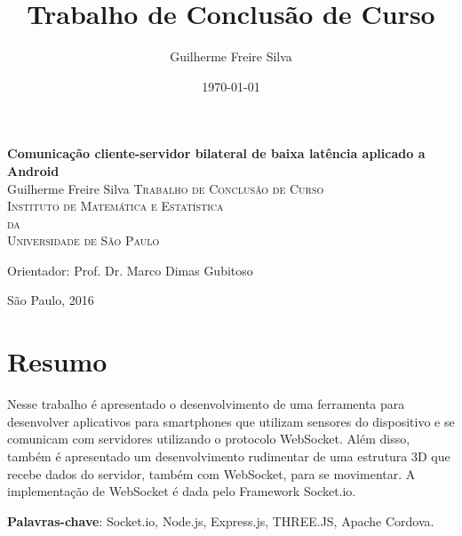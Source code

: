 \documentclass[a4paper,12pt]{article}
\title{Trabalho de Conclusão de Curso}
\author{Guilherme Freire Silva}
\date{\today}
\begin{document}

\thispagestyle{empty}
\begin{center}
    \vspace*{2.3cm}
    \textbf{\Large{Comunicação cliente-servidor bilateral de baixa latência aplicado a Android}}\\


    \vspace*{1.2cm}
    \Large{
        Guilherme Freire Silva
    }
    \vskip 2cm
    \textsc{
     Trabalho de Conclusão de Curso \\[-0.25cm]
    Instituto de Matemática e Estatística\\[-0.25cm]
    da\\[-0.25cm]
    Universidade de São Paulo\\[-0.25cm]%
    }

    \vskip 2.5cm
    Orientador: Prof. Dr. Marco Dimas Gubitoso

    \vskip 3.5cm
    \normalsize{São Paulo, 2016}
\end{center}

\newpage

\newpage
\section{Resumo}

Nesse trabalho é apresentado o desenvolvimento de uma ferramenta para desenvolver aplicativos para smartphones que utilizam sensores do dispositivo e se comunicam com servidores utilizando o protocolo WebSocket. Além disso, também é apresentado um desenvolvimento rudimentar de uma estrutura 3D que recebe dados do servidor, também com WebSocket, para se movimentar. A implementação de WebSocket é dada pelo Framework Socket.io.


\textbf{Palavras-chave}: Socket.io, Node.js, Express.js, THREE.JS, Apache Cordova.


\newpage
\tableofcontents

\newpage
{}     %

\renewcommand{\arraystretch}{1.2}
\end{document}
